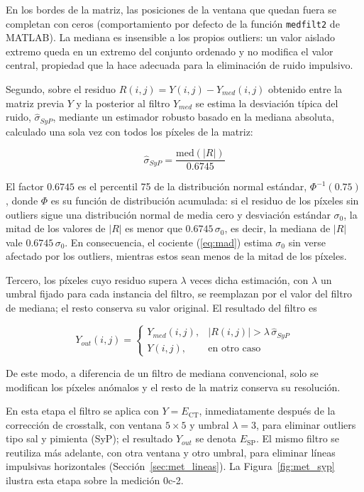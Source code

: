 En los bordes de la matriz, las posiciones de la ventana que quedan fuera se completan con ceros (comportamiento por defecto de la función \texttt{medfilt2} de MATLAB). La mediana es insensible a los propios outliers: un valor aislado extremo queda en un extremo del conjunto ordenado y no modifica el valor central, propiedad que la hace adecuada para la eliminación de ruido impulsivo.

Segundo, sobre el residuo $R(i,j) = Y(i,j) - Y_{med}(i,j)$ obtenido entre la matriz previa $Y$ y la posterior al filtro $Y_{med}$ se estima la desviación típica del ruido, $\hat\sigma_{SyP}$, mediante un estimador robusto basado en la mediana absoluta, calculado una sola vez con todos los píxeles de la matriz:

\begin{equation}
\hat\sigma_{SyP} = \frac{\mathrm{med}(|R|)}{0.6745}
\label{eq:mad}
\end{equation}

El factor $0.6745$ es el percentil 75 de la distribución normal estándar, $\Phi^{-1}(0.75)$, donde $\Phi$ es su función de distribución acumulada: si el residuo de los píxeles sin outliers sigue una distribución normal de media cero y desviación estándar $\sigma_0$, la mitad de los valores de $|R|$ es menor que $0.6745\,\sigma_0$, es decir, la mediana de $|R|$ vale $0.6745\,\sigma_0$. En consecuencia, el cociente (\ref{eq:mad}) estima $\sigma_0$ sin verse afectado por los outliers, mientras estos sean menos de la mitad de los píxeles.

Tercero, los píxeles cuyo residuo supera $\lambda$ veces dicha estimación, con $\lambda$ un umbral fijado para cada instancia del filtro, se reemplazan por el valor del filtro de mediana; el resto conserva su valor original. El resultado del filtro es

\begin{equation}
Y_{out}(i,j) =
\begin{cases}
Y_{med}(i,j), & |R(i,j)| > \lambda\,\hat\sigma_{SyP} \\
Y(i,j), & \text{en otro caso}
\end{cases}
\label{eq:impulsivo}
\end{equation}

De este modo, a diferencia de un filtro de mediana convencional, solo se modifican los píxeles anómalos y el resto de la matriz conserva su resolución.

En esta etapa el filtro se aplica con $Y = E_{\mathrm{CT}}$, inmediatamente después de la corrección de crosstalk, con ventana $5\times5$ y umbral $\lambda=3$, para eliminar outliers tipo sal y pimienta (SyP); el resultado $Y_{out}$ se denota $E_{\mathrm{SP}}$. El mismo filtro se reutiliza más adelante, con otra ventana y otro umbral, para eliminar líneas impulsivas horizontales (Sección~\ref{sec:met_lineas}). La Figura~\ref{fig:met_syp} ilustra esta etapa sobre la medición 0c-2.

